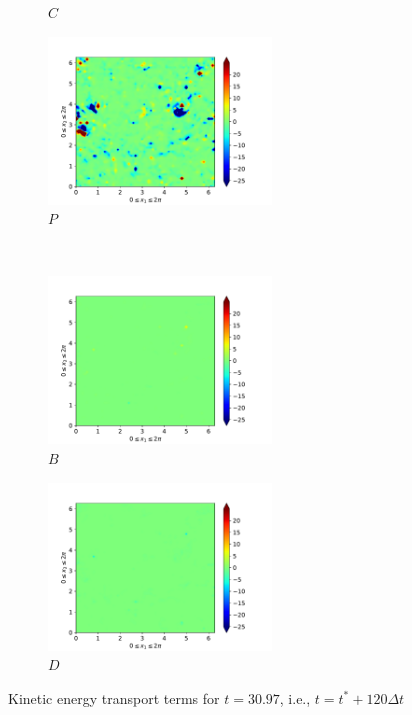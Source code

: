 \begin{figure}[H]
\begin{subfigure}{0.45\textwidth}
        \caption{$C$}
    \end{subfigure}
    \newline
    \begin{subfigure}{0.45\textwidth}
        \includegraphics[height=1.75in]{media/run-cds-65/P-ke-1460}
        \caption{$P$}
    \end{subfigure}
    ~
    \begin{subfigure}{0.45\textwidth}
        \includegraphics[height=1.75in]{media/run-cds-65/B-ke-1460}
        \caption{$B$}
    \end{subfigure}
    \newline
    \begin{subfigure}{0.45\textwidth}
        \includegraphics[height=1.75in]{media/run-cds-65/D-ke-1460}
        \caption{$D$}
    \end{subfigure}
    \caption{Kinetic energy transport terms for $t=30.97$, i.e., $t=t^{\ast} + 120 \Delta t$}
\end{figure}
